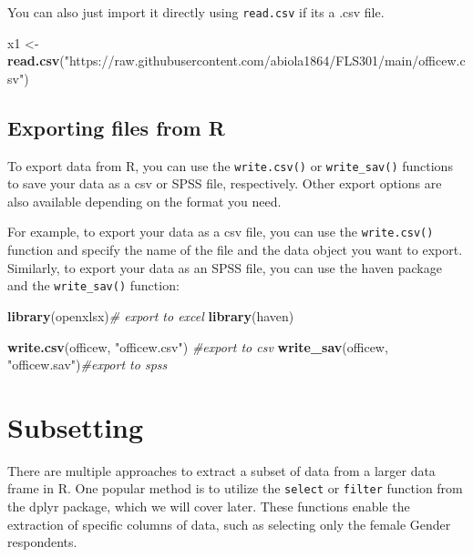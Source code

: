 \documentclass[
]{article}
\newenvironment{Shaded}{\begin{snugshade}}{\end{snugshade}}
\newcommand{\CommentTok}[1]{\textcolor[rgb]{0.56,0.35,0.01}{\textit{#1}}}
\newcommand{\FunctionTok}[1]{\textcolor[rgb]{0.13,0.29,0.53}{\textbf{#1}}}
\newcommand{\NormalTok}[1]{#1}
\newcommand{\OtherTok}[1]{\textcolor[rgb]{0.56,0.35,0.01}{#1}}
\newcommand{\StringTok}[1]{\textcolor[rgb]{0.31,0.60,0.02}{#1}}
\begin{document}
You can also just import it directly using \texttt{read.csv} if its a
.csv file.

\begin{Shaded}
\begin{Highlighting}[]
\NormalTok{x1 }\OtherTok{\textless{}{-}} \FunctionTok{read.csv}\NormalTok{(}\StringTok{"https://raw.githubusercontent.com/abiola1864/FLS301/main/officew.csv"}\NormalTok{)}
\end{Highlighting}
\end{Shaded}

\hypertarget{exporting-files-from-r}{%
\subsection{Exporting files from R}\label{exporting-files-from-r}}

To export data from R, you can use the \texttt{write.csv()} or
\texttt{write\_sav()} functions to save your data as a csv or SPSS file,
respectively. Other export options are also available depending on the
format you need.

For example, to export your data as a csv file, you can use the
\texttt{write.csv()} function and specify the name of the file and the
data object you want to export. Similarly, to export your data as an
SPSS file, you can use the haven package and the \texttt{write\_sav()}
function:

\begin{Shaded}
\begin{Highlighting}[]
\FunctionTok{library}\NormalTok{(openxlsx)}\CommentTok{\# export to excel}
\FunctionTok{library}\NormalTok{(haven)}

\FunctionTok{write.csv}\NormalTok{(officew, }\StringTok{"officew.csv"}\NormalTok{) }\CommentTok{\#export to csv}
\FunctionTok{write\_sav}\NormalTok{(officew, }\StringTok{"officew.sav"}\NormalTok{)}\CommentTok{\#export to spss}
\end{Highlighting}
\end{Shaded}

\hypertarget{subsetting}{%
\section{Subsetting}\label{subsetting}}

There are multiple approaches to extract a subset of data from a larger
data frame in R. One popular method is to utilize the \texttt{select} or
\texttt{filter} function from the dplyr package, which we will cover
later. These functions enable the extraction of specific columns of
data, such as selecting only the female Gender respondents.
\end{document}
